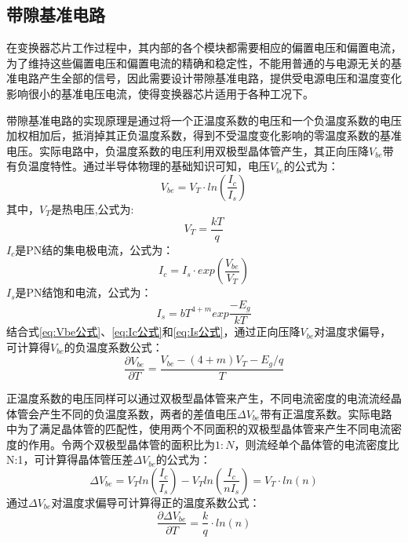 \subsection{带隙基准电路}

在变换器芯片工作过程中，其内部的各个模块都需要相应的偏置电压和偏置电流，为了维持这些偏置电压和偏置电流的精确和稳定性，不能用普通的与电源无关的基准电路产生全部的信号，因此需要设计带隙基准电路，提供受电源电压和温度变化影响很小的基准电压电流，使得变换器芯片适用于各种工况下。

带隙基准电路的实现原理是通过将一个正温度系数的电压和一个负温度系数的电压加权相加后，抵消掉其正负温度系数，得到不受温度变化影响的零温度系数的基准电压。实际电路中，负温度系数的电压利用双极型晶体管产生，其正向压降$V_{be}$带有负温度特性。通过半导体物理的基础知识可知，电压$V_{be}$的公式为：
\begin{equation}
    \label{eq:Vbe公式}
    V_{be} = V_T \cdot ln(\frac{I_c}{I_s})
\end{equation}
其中，$V_T$是热电压,公式为:
\begin{equation}
    \label{eq:VT公式}
    V_T=\frac{kT}{q}
\end{equation}
$I_c$是PN结的集电极电流，公式为：
\begin{equation}
    \label{eq:Ic公式}
    I_c=I_s \cdot exp(\frac{V_{be}}{V_T})
\end{equation}
$I_s$是PN结饱和电流，公式为：
\begin{equation}
    \label{eq:Is公式}
    I_s=bT^{4+m} exp\frac{-E_g}{kT}
\end{equation}
结合式\eqref{eq:Vbe公式}、\eqref{eq:Ic公式}和\eqref{eq:Is公式}，通过正向压降$V_{be}$对温度求偏导，可计算得$V_{be}$的负温度系数公式：
\begin{equation}
    \label{eq:Vbe/T公式}
    \frac{\partial V_{be}}{\partial T} = \frac{ V_{be} - (4+m)V_T - E_g/q}{T}
\end{equation}

正温度系数的电压同样可以通过双极型晶体管来产生，不同电流密度的电流流经晶体管会产生不同的负温度系数，两者的差值电压$\varDelta V_{be}$带有正温度系数。实际电路中为了满足晶体管的匹配性，使用两个不同面积的双极型晶体管来产生不同电流密度的作用。令两个双极型晶体管的面积比为$1:N$，则流经单个晶体管的电流密度比N:1，可计算得晶体管压差$\varDelta V_{be}$的公式为：
\begin{equation}
    \label{eq:△Vbe公式}
    \varDelta V_{be} = V_T ln(\frac{I_c}{I_s}) - V_T ln(\frac{I_c}{nI_s}) = V_T \cdot ln(n)
\end{equation}
通过$\varDelta V_{be}$对温度求偏导可计算得正的温度系数公式：
\begin{equation}
    \label{eq:△Vbe/T公式}
    \frac{\partial \varDelta V_{be}}{\partial T} = \frac{k}{q}\cdot ln(n)
\end{equation}


